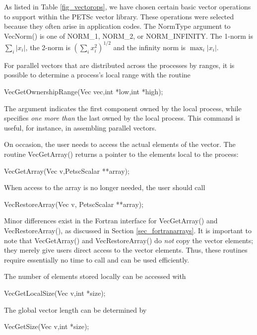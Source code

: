 As listed in Table \ref{fig_vectorops}, we have chosen certain 
basic vector operations to support within the PETSc vector library.
These operations were selected because they often arise in application 
codes. The NormType argument to VecNorm() is one of 
NORM_1, NORM_2, or NORM_INFINITY.
  The 1-norm is 
$ \sum_i |x_{i}|$, the 2-norm is $( \sum_{i} x_{i}^{2})^{1/2} $ and the 
infinity norm is $ \max_{i} |x_{i}|$. 


For parallel vectors that are distributed across the processes by ranges, 
it is possible to determine 
a process's local range with the routine
\begin{tabbing}
  VecGetOwnershipRange(Vec vec,int *low,int *high);
\end{tabbing}
The argument  indicates the first component owned by the local 
process, while  specifies {\em one more than} the 
last owned by the local process.
This command is useful, for instance, in assembling parallel vectors.

On occasion, the user needs to access the actual elements of the vector. 
The routine VecGetArray() 
returns a pointer to the elements local to the process:
\begin{tabbing}
  VecGetArray(Vec v,PetscScalar **array);
\end{tabbing}
When access to the array is no longer
needed, the user should call
\begin{tabbing}
  VecRestoreArray(Vec v, PetscScalar **array);
\end{tabbing}
Minor differences exist in the Fortran interface for VecGetArray() and 
VecRestoreArray(), as discussed in Section \ref{sec_fortranarrays}.  
It is important to note that VecGetArray() and VecRestoreArray()
do {\em not} copy the vector elements; they merely give users direct
access to the vector elements. Thus, these routines require essentially
no time to call and can be used efficiently.

The number of elements stored locally can be accessed with
\begin{tabbing}
  VecGetLocalSize(Vec v,int *size);
\end{tabbing}
The global vector length can be determined by
\begin{tabbing}
  VecGetSize(Vec v,int *size);
\end{tabbing}


